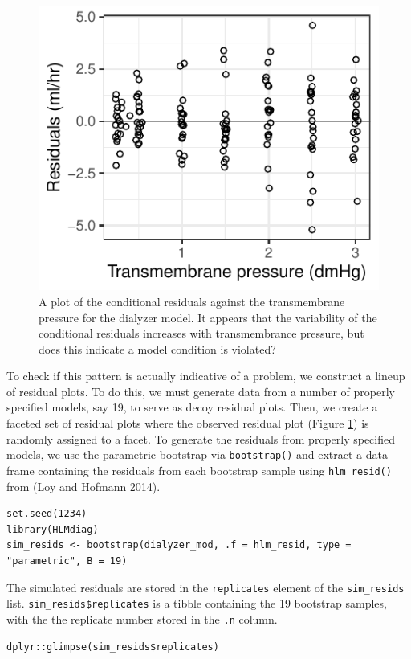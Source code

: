 \begin{figure}

{\centering \includegraphics[width=0.4\linewidth]{RJ-2023-015_files/figure-latex/residdialyzer-1} 

}

\caption{A plot of the conditional residuals against the transmembrane pressure for the dialyzer model. It appears that the variability of the conditional residuals increases with transmembrance pressure, but does this indicate a model condition is violated?}\label{fig:residdialyzer}
\end{figure}

To check if this pattern is actually indicative of a problem, we construct a lineup of residual plots. To do this, we must generate data from a number of properly specified models, say 19, to serve as decoy residual plots. Then, we create a faceted set of residual plots where the observed residual plot (Figure \ref{fig:residdialyzer}) is randomly assigned to a facet. To generate the residuals from properly specified models, we use the parametric bootstrap via \texttt{bootstrap()} and extract a data frame containing the residuals from each bootstrap sample using \texttt{hlm\_resid()} from  (Loy and Hofmann 2014).

\begin{verbatim}
set.seed(1234)
library(HLMdiag)
sim_resids <- bootstrap(dialyzer_mod, .f = hlm_resid, type = "parametric", B = 19)
\end{verbatim}

\noindent The simulated residuals are stored in the \texttt{replicates} element of the \texttt{sim\_resids} list. \texttt{sim\_resids\$replicates} is a tibble containing the 19 bootstrap samples, with the the replicate number stored in the \texttt{.n} column.

\begin{verbatim}
dplyr::glimpse(sim_resids$replicates)
\end{verbatim}

